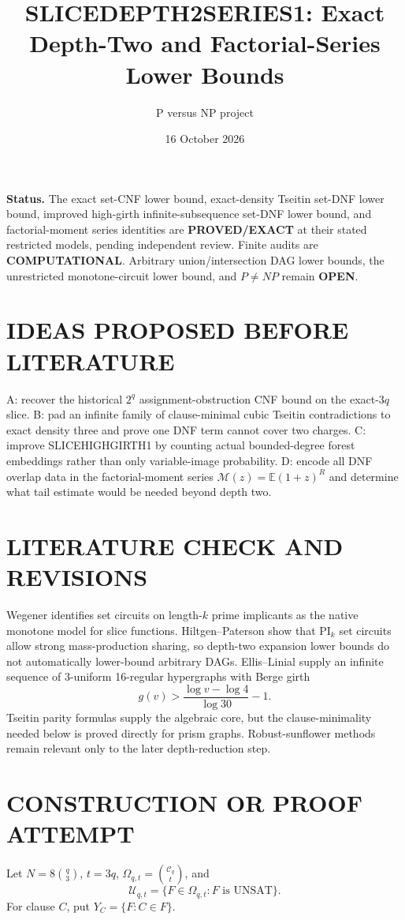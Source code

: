 \documentclass[11pt]{article}
\title{SLICEDEPTH2SERIES1: Exact Depth-Two and Factorial-Series Lower Bounds}
\author{P versus NP project}
\date{16 October 2026}
\begin{document}
\maketitle
\noindent\textbf{Status.} The exact set-CNF lower bound, exact-density Tseitin set-DNF lower bound, improved high-girth infinite-subsequence set-DNF lower bound, and factorial-moment series identities are \textbf{PROVED/EXACT} at their stated restricted models, pending independent review. Finite audits are \textbf{COMPUTATIONAL}. Arbitrary union/intersection DAG lower bounds, the unrestricted monotone-circuit lower bound, and $P\ne NP$ remain \textbf{OPEN}.

\section{IDEAS PROPOSED BEFORE LITERATURE}
A: recover the historical $2^q$ assignment-obstruction CNF bound on the exact-$3q$ slice. B: pad an infinite family of clause-minimal cubic Tseitin contradictions to exact density three and prove one DNF term cannot cover two charges. C: improve SLICEHIGHGIRTH1 by counting actual bounded-degree forest embeddings rather than only variable-image probability. D: encode all DNF overlap data in the factorial-moment series $\mathcal M(z)=\mathbb E(1+z)^R$ and determine what tail estimate would be needed beyond depth two.

\section{LITERATURE CHECK AND REVISIONS}
Wegener identifies set circuits on length-$k$ prime implicants as the native monotone model for slice functions. Hiltgen--Paterson show that PI$_k$ set circuits allow strong mass-production sharing, so depth-two expansion lower bounds do not automatically lower-bound arbitrary DAGs. Ellis--Linial supply an infinite sequence of 3-uniform 16-regular hypergraphs with Berge girth
\[
g(v)>\frac{\log v-\log4}{\log30}-1.
\]
Tseitin parity formulas supply the algebraic core, but the clause-minimality needed below is proved directly for prism graphs. Robust-sunflower methods remain relevant only to the later depth-reduction step.

\section{CONSTRUCTION OR PROOF ATTEMPT}
Let $N=8\binom q3$, $t=3q$, $\Omega_{q,t}=\binom{\mathcal C_q}{t}$, and
\[
\mathcal U_{q,t}=\{F\in\Omega_{q,t}:F\text{ is UNSAT}\}.
\]
For clause $C$, put $Y_C=\{F:C\in F\}$.
\end{document}
